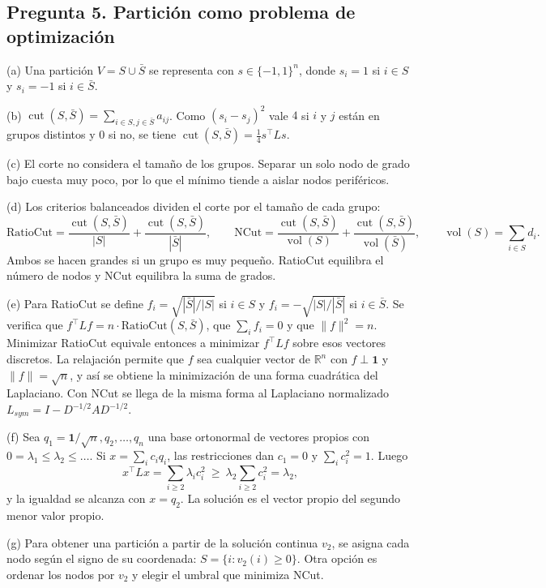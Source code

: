\documentclass[11pt,a4paper]{article}
\newcommand{\uno}{\mathbf{1}}
\newcommand{\cut}{\operatorname{cut}}
\newcommand{\vol}{\operatorname{vol}}
\begin{document}
\subsection{Pregunta 5. Partición como problema de optimización}

(a) Una partición $V=S\cup\bar S$ se representa con $s\in\{-1,1\}^n$, donde $s_i=1$ si $i\in S$ y $s_i=-1$ si $i\in\bar S$.

(b) $\cut(S,\bar S)=\sum_{i\in S,j\in\bar S}a_{ij}$. Como $(s_i-s_j)^2$ vale $4$ si $i$ y $j$ están en grupos distintos y $0$ si no, se tiene $\cut(S,\bar S)=\tfrac14s^\top Ls$.

(c) El corte no considera el tamaño de los grupos. Separar un solo nodo de grado bajo cuesta muy poco, por lo que el mínimo tiende a aislar nodos periféricos.

(d) Los criterios balanceados dividen el corte por el tamaño de cada grupo:
\[
\mathrm{RatioCut}=\frac{\cut(S,\bar S)}{|S|}+\frac{\cut(S,\bar S)}{|\bar S|},\qquad
\mathrm{NCut}=\frac{\cut(S,\bar S)}{\vol(S)}+\frac{\cut(S,\bar S)}{\vol(\bar S)},\qquad \vol(S)=\sum_{i\in S}d_i .
\]
Ambos se hacen grandes si un grupo es muy pequeño. RatioCut equilibra el número de nodos y NCut equilibra la suma de grados.

(e) Para RatioCut se define $f_i=\sqrt{|\bar S|/|S|}$ si $i\in S$ y $f_i=-\sqrt{|S|/|\bar S|}$ si $i\in\bar S$. Se verifica que $f^\top Lf=n\cdot\mathrm{RatioCut}(S,\bar S)$, que $\sum_if_i=0$ y que $\|f\|^2=n$. Minimizar RatioCut equivale entonces a minimizar $f^\top Lf$ sobre esos vectores discretos. La relajación permite que $f$ sea cualquier vector de $\mathbb{R}^n$ con $f\perp\uno$ y $\|f\|=\sqrt n$, y así se obtiene la minimización de una forma cuadrática del Laplaciano. Con NCut se llega de la misma forma al Laplaciano normalizado $L_{sym}=I-D^{-1/2}AD^{-1/2}$.

(f) Sea $q_1=\uno/\sqrt n,q_2,\dots,q_n$ una base ortonormal de vectores propios con $0=\lambda_1\le\lambda_2\le\dots$. Si $x=\sum_ic_iq_i$, las restricciones dan $c_1=0$ y $\sum_ic_i^2=1$. Luego
\[
x^\top Lx=\sum_{i\ge2}\lambda_ic_i^2\ \ge\ \lambda_2\sum_{i\ge2}c_i^2=\lambda_2,
\]
y la igualdad se alcanza con $x=q_2$. La solución es el vector propio del segundo menor valor propio.

(g) Para obtener una partición a partir de la solución continua $v_2$, se asigna cada nodo según el signo de su coordenada: $S=\{i:v_2(i)\ge0\}$. Otra opción es ordenar los nodos por $v_2$ y elegir el umbral que minimiza NCut.
\end{document}
